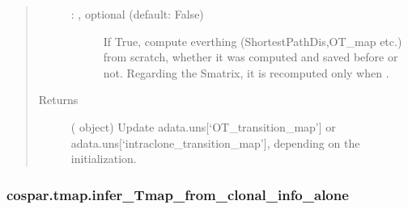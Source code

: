 \documentclass[letterpaper,10pt,english]{sphinxmanual}
\begin{document}
\begin{fulllineitems}
\begin{quote}
\begin{description}
\begin{description}
\item[{ : , optional (default: False)}] \leavevmode
If True, compute everthing (ShortestPathDis,OT\_map etc.) from scratch,
whether it was computed and saved before or not. Regarding the Smatrix, it is
recomputed only when .

\end{description}

\item[{Returns}] \leavevmode
{} ( object) \textendash{} Update adata.uns{[}‘OT\_transition\_map’{]} or adata.uns{[}‘intraclone\_transition\_map’{]},
depending on the initialization.

\end{description}\end{quote}

\end{fulllineitems}



\subsubsection{cospar.tmap.infer\_Tmap\_from\_clonal\_info\_alone}
\label{\detokenize{cospar.tmap.infer_Tmap_from_clonal_info_alone:cospar-tmap-infer-tmap-from-clonal-info-alone}}\label{\detokenize{cospar.tmap.infer_Tmap_from_clonal_info_alone::doc}}
\end{document}
